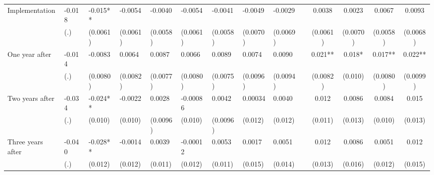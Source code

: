 \begin{tabular}{lccccrrrrrcccc}
Implementation & \multicolumn{1}{l}{-0.018} & \multicolumn{1}{l}{-0.015**} & \multicolumn{1}{l}{-0.0054} & \multicolumn{1}{l}{-0.0040} & \multicolumn{1}{l}{-0.0054} & \multicolumn{1}{l}{-0.0041} & \multicolumn{1}{l}{-0.0049} & \multicolumn{1}{l}{-0.0029} &       & 0.0038 & 0.0023 & 0.0067 & 0.0093 \\
      & \multicolumn{1}{l}{(.)} & \multicolumn{1}{l}{(0.0061)} & \multicolumn{1}{l}{(0.0061)} & \multicolumn{1}{l}{(0.0058)} & \multicolumn{1}{l}{(0.0061)} & \multicolumn{1}{l}{(0.0058)} & \multicolumn{1}{l}{(0.0070)} & \multicolumn{1}{l}{(0.0069)} &       & (0.0061) & (0.0070) & (0.0058) & (0.0068) \\
One year after & \multicolumn{1}{l}{-0.014} & \multicolumn{1}{l}{-0.0083} & \multicolumn{1}{l}{0.0064} & \multicolumn{1}{l}{0.0087} & \multicolumn{1}{l}{0.0066} & \multicolumn{1}{l}{0.0089} & \multicolumn{1}{l}{0.0074} & \multicolumn{1}{l}{0.0090} &       & 0.021** & 0.018* & 0.017** & 0.022** \\
      & \multicolumn{1}{l}{(.)} & \multicolumn{1}{l}{(0.0080)} & \multicolumn{1}{l}{(0.0082)} & \multicolumn{1}{l}{(0.0077)} & \multicolumn{1}{l}{(0.0080)} & \multicolumn{1}{l}{(0.0075)} & \multicolumn{1}{l}{(0.0096)} & \multicolumn{1}{l}{(0.0094)} &       & (0.0082) & (0.010) & (0.0080) & (0.0099) \\
Two years after & \multicolumn{1}{l}{-0.034} & \multicolumn{1}{l}{-0.024**} & \multicolumn{1}{l}{-0.0022} & \multicolumn{1}{l}{0.0028} & \multicolumn{1}{l}{-0.00086} & \multicolumn{1}{l}{0.0042} & \multicolumn{1}{l}{0.00034} & \multicolumn{1}{l}{0.0040} &       & 0.012 & 0.0086 & 0.0084 & 0.015 \\
      & \multicolumn{1}{l}{(.)} & \multicolumn{1}{l}{(0.010)} & \multicolumn{1}{l}{(0.010)} & \multicolumn{1}{l}{(0.0096)} & \multicolumn{1}{l}{(0.010)} & \multicolumn{1}{l}{(0.0096)} & \multicolumn{1}{l}{(0.012)} & \multicolumn{1}{l}{(0.012)} &       & (0.011) & (0.013) & (0.010) & (0.013) \\
Three years after & \multicolumn{1}{l}{-0.040} & \multicolumn{1}{l}{-0.028**} & \multicolumn{1}{l}{-0.0014} & \multicolumn{1}{l}{0.0039} & \multicolumn{1}{l}{-0.00012} & \multicolumn{1}{l}{0.0053} & \multicolumn{1}{l}{0.0017} & \multicolumn{1}{l}{0.0051} &       & 0.012 & 0.0086 & 0.0051 & 0.012 \\
      & \multicolumn{1}{l}{(.)} & \multicolumn{1}{l}{(0.012)} & \multicolumn{1}{l}{(0.012)} & \multicolumn{1}{l}{(0.011)} & \multicolumn{1}{l}{(0.012)} & \multicolumn{1}{l}{(0.011)} & \multicolumn{1}{l}{(0.015)} & \multicolumn{1}{l}{(0.014)} &       & (0.013) & (0.016) & (0.012) & (0.015) \\

\end{tabular}
